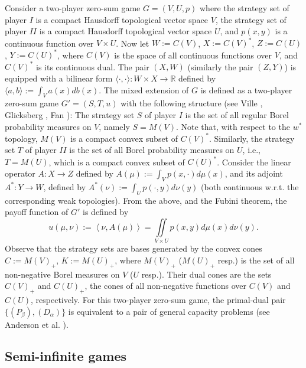 \documentclass[11pt, twoside]{article}
\numberwithin{equation}{section}
\theoremstyle{definition}
\begin{document}
  Consider a two-player zero-sum game $G=(V,U,p)$ where the strategy set of player $I$ is a compact Hausdorff topological vector space $V$, the strategy set of player $II$ is a compact Hausdorff topological vector space $U$, and $p(x,y)$ is a continuous function over $V\times U$. Now let $W:=  C(V)$, $X:=  C(V)^*$, $Z:=  C(U)$, $Y:=  C(U)^*$, where $C(V)$ is the space of all continuous functions over $V$, and $C(V)^*$ is its continuous dual. The pair $(X,W)$ (similarly the pair $(Z,Y)$) is equipped with a bilinear form $\langle\cdot,\cdot\rangle:W\times X\rightarrow \mathbb{R}$ defined by $\langle a,b\rangle:=  \int_{V}a(x)db(x)$. The mixed extension of $G$ is defined as a two-player zero-sum game $G'=(S,T,u)$ with the following structure (see Ville \cite{ville1938theorie}, Glicksberg \cite{glicksberg1952further}, Fan \cite{fan1952fixed}): The strategy set $S$ of player $I$ is the set of all regular Borel probability measures on $V$, namely $S=M(V)$. Note that, with respect to the $w^*$ topology, $M(V)$ is a compact convex subset of $C(V)^*$. Similarly, the strategy set $T$ of player $II$ is the set of all Borel probability measures on $U$, i.e., $T=M(U)$, which is a compact convex subset of $C(U)^*$. Consider the linear operator $A:X\rightarrow Z$ defined by $A(\mu):=  \int_{V}p(x,\cdot)d\mu(x)$, and its adjoint $A^*:Y\rightarrow W$, defined by $A^*(\nu):=  \int_{U}p(\cdot,y)d\nu(y)$ (both continuous w.r.t. the corresponding weak topologies). From the above, and the Fubini theorem, the payoff function of $G'$ is defined by
 \begin{equation*}
     u(\mu,\nu):=  \left\langle \nu,A(\mu)\right\rangle=\iint\limits_{V\times U}p(x,y)d\mu(x)d\nu(y).
 \end{equation*}
 Observe that the strategy sets are bases generated by the convex cones $C:=  M(V)_{+}$, $K:=  M(U)_{+}$, where $M(V)_{+}$ ($M(U)_{+}$ resp.) is the set of all non-negative Borel measures on $V$ ($U$ resp.). Their dual cones are the sets $C(V)_{+}$ and $C(U)_{+}$, the cones of all non-negative functions over $C(V)$ and $C(U)$, respectively. For this two-player zero-sum game, the primal-dual pair \hyperlink{newprimaldual}{$\{(P_\beta),(D_\alpha)\}$} is equivalent to a pair of general capacity problems (see Anderson et al. \cite{anderson1989capacity}).


\vspace{-0.1cm}\subsection{Semi-infinite games}\vspace{-0.2cm} 
\end{document}
